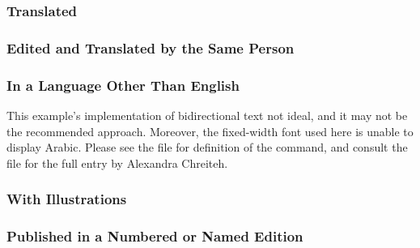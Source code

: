 \documentclass{ltxdockit}
\begin{document}
\subsubsection{Translated} %
\label{ssub:translated}
\begin{refsection}
	\printbibliography[heading=none]
\end{refsection}
\subsubsection{Edited and Translated by the Same Person} %
\label{ssub:edited_and_translated_by_the_same_person}
\begin{refsection}
	\printbibliography[heading=none]
\end{refsection}
\subsubsection{In a Language Other Than English} %
\label{ssub:in_a_language_other_than_english}
\begin{refsection}
This example's implementation of bidirectional text not ideal, and it may not be the recommended approach. Moreover, the fixed-width font used here is unable to display Arabic. Please see the  file for definition of the  command, and consult the  file for the full entry by Alexandra Chreiteh.
	\printbibliography[heading=none]
\end{refsection}
\subsubsection{With Illustrations} %
\label{ssub:with_illustrations}
\begin{refsection}
	\printbibliography[heading=none]
\end{refsection}
\subsubsection{Published in a Numbered or Named Edition} %
\label{ssub:published_in_a_numbered_or_named_edition}
\begin{refsection}
	\printbibliography[heading=none]
\end{refsection}
\end{document}
